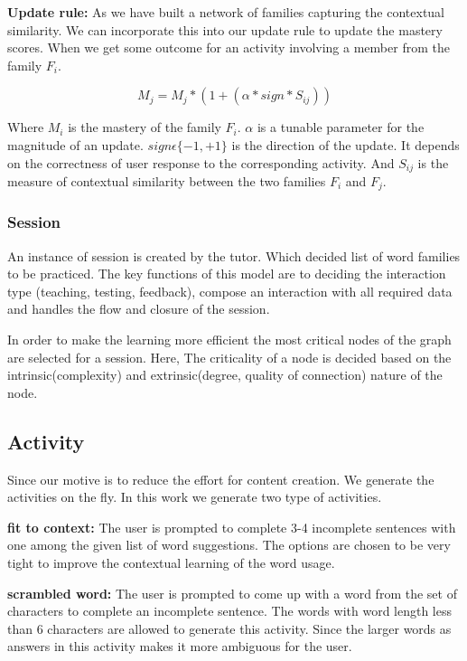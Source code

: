 \documentclass[11pt,a4paper]{article}
\begin{document}
\textbf{Update rule:} As we have built a network of families capturing the
contextual similarity. We can incorporate this into our update rule to update
the mastery scores. When we get some outcome for an activity involving a member
from the family ${F_i}$.

\begin{equation}
  M_j = M_j * (1 + (\alpha * sign * S_{ij}))
\end{equation}

Where ${M_i}$ is the mastery of the family ${F_i}$. ${\alpha}$ is a tunable parameter
for the magnitude of an update. ${sign \epsilon \{-1, +1\}}$ is the direction 
of the update. It depends on the correctness of user response to the corresponding
activity. And ${S_{ij}}$ is the measure of contextual similarity between the two
families ${F_i}$ and ${F_j}$.

\subsubsection{Session}
An instance of session is created by the tutor. Which decided list of word
families to be practiced. The key functions of this model are to deciding the
interaction type (teaching, testing, feedback), compose an interaction with all
required data and handles the flow and closure of the session.

In order to make the learning more efficient the most critical nodes of the
graph are selected for a session. Here, The criticality of a node is decided
based on the intrinsic(complexity) and extrinsic(degree, quality of connection)
nature of the node.


\subsection{Activity}
Since our motive is to reduce the effort for content creation. We generate the
activities on the fly. In this work we generate two type of activities. 

\textbf{fit to context:} The user is prompted to complete 3-4 incomplete
sentences with one among the given list of word suggestions. The options are
chosen to be very tight to improve the contextual learning of the word usage.

\textbf{scrambled word:} The user is prompted to come up with a word from the
set of characters to complete an incomplete sentence. The words with word length
less than 6 characters are allowed to generate this activity. Since the larger
words as answers in this activity makes it more ambiguous for the user.
\end{document}
